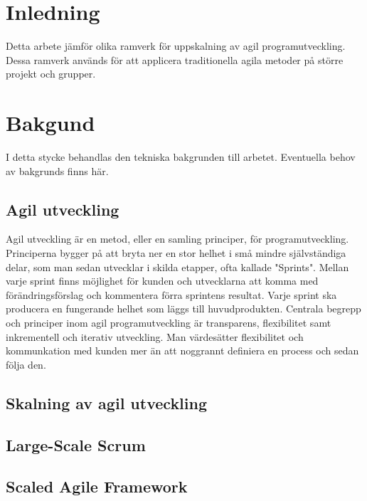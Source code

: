 \section{Inledning}

Detta arbete jämför olika ramverk för uppskalning av agil programutveckling. Dessa ramverk används för att applicera traditionella agila metoder på större projekt och grupper.

\newpage

\section{Bakgund} 	


I detta stycke behandlas den tekniska bakgrunden till arbetet. Eventuella behov av bakgrunds finns här.

\subsection{Agil utveckling}

Agil utveckling är en metod, eller en samling principer, för programutveckling. Principerna bygger på att bryta ner en stor helhet i små mindre självständiga delar, som man sedan utvecklar i skilda etapper, ofta kallade "Sprints".
Mellan varje sprint finns möjlighet för kunden och utvecklarna att komma med förändringsförslag och kommentera förra sprintens resultat. Varje sprint ska producera en fungerande helhet som läggs till huvudprodukten. Centrala begrepp och principer inom agil programutveckling är transparens, flexibilitet samt inkrementell och iterativ utveckling. Man värdesätter flexibilitet och kommunkation med kunden mer än att noggrannt definiera en process och sedan följa den. \cite{agile_manifesto}

\subsection{Skalning av agil utveckling}


\subsection{Large-Scale Scrum}


\subsection{Scaled Agile Framework}


